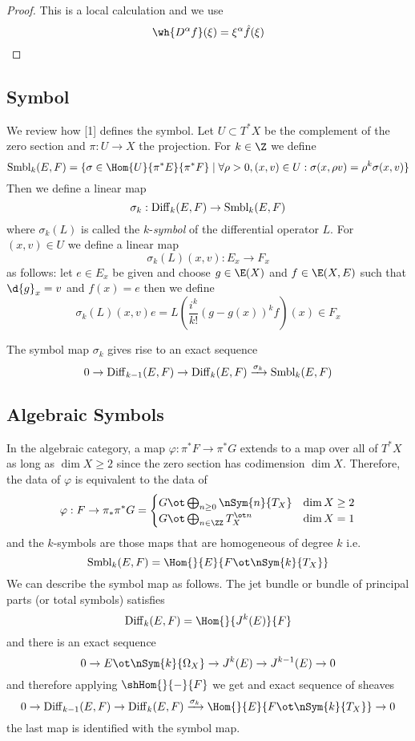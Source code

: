 \documentclass[12pt]{article}
\theoremstyle{plain}
\begin{document}
\begin{proof}
This is a local calculation and we use
\[ \wh{D^\alpha f}(\xi) = \xi^\alpha \hat{f}(\xi) \]
\end{proof}

\subsection{Symbol}

\newcommand{\Smbl}{\mathrm{Smbl}}

We review how [1] defines the symbol. Let $U \subset T^* X$ be the complement of the zero section and $\pi : U \to X$ the projection. For $k \in \Z$ we define
\[ \Smbl_k(E, F) = \{ \sigma \in \Hom{U}{\pi^* E}{\pi^* F} \mid \forall \rho > 0, (x,v) \in U : \sigma(x, \rho v) = \rho^k \sigma(x,v) \} \]
Then we define a linear map
\[ \sigma_k : \Diff_k(E, F) \to \Smbl_k(E, F) \]
where $\sigma_k(L)$ is called the $k$-\textit{symbol} of the differential operator $L$. For $(x,v) \in U$ we define a linear map
\[ \sigma_k(L)(x,v) : E_x \to F_x \]
as follows: let $e \in E_x$ be given and choose $g \in \E(X)$ and $f \in \E(X,E)$ such that $\d{g}_x = v$ and $f(x) = e$ then we define
\[ \sigma_k(L)(x,v) e = L \left( \frac{i^k}{k!} (g - g(x))^k f \right)(x) \in F_x \]

\begin{prop}
The symbol map $\sigma_k$ gives rise to an exact sequence
\[ 0 \to \Diff_{k-1}(E, F) \to \Diff_k(E, F) \xrightarrow{\sigma_k} \Smbl_k(E, F) \]
\end{prop}

\subsection{Algebraic Symbols}

In the algebraic category, a map $\varphi : \pi^* F \to \pi^* G$ extends to a map over all of $T^* X$ as long as $\dim{X} \ge 2$ since the zero section has codimension $\dim{X}$. Therefore, the data of $\varphi$ is equivalent to the data of 
\[ \varphi : F \to \pi_* \pi^* G = 
\begin{cases}
G \ot \bigoplus_{n \ge 0} \nSym{n}{T_X} & \dim{X} \ge 2
\\
G \ot \bigoplus_{n \in \ZZ} T_X^{\ot n} & \dim{X} = 1
\end{cases} \]
and the $k$-symbols are those maps that are homogeneous of degree $k$ i.e.
\[ \Smbl_k(E, F) = \Hom{}{E}{F \ot \nSym{k}{T_X}} \]
We can describe the symbol map as follows. The jet bundle or bundle of principal parts (or total symbols) satisfies
\[ \Diff_k(E, F) = \Hom{}{J^k(E)}{F} \]
and there is an exact sequence
\[ 0 \to E \ot \nSym{k}{\Omega_X} \to J^k(E) \to J^{k-1}(E) \to 0 \]
and therefore applying $\shHom{}{-}{F}$ we get and exact sequence of sheaves
\[ 0 \to \Diff_{k-1}(E, F) \to \Diff_k(E, F) \xrightarrow{\sigma_k} \Hom{}{E}{F \ot \nSym{k}{T_X}} \to 0 \]
the last map is identified with the symbol map. 
\end{document}

